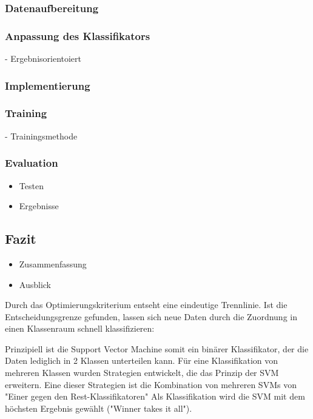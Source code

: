 \subsubsection{Datenaufbereitung}

\subsubsection{Anpassung des Klassifikators}
- Ergebnisorientoiert

\subsubsection{Implementierung}

\subsubsection{Training}
- Trainingsmethode

\subsubsection{Evaluation}
\begin{itemize}
\item{Testen}
\item{Ergebnisse}
\end{itemize}

\subsection{Fazit}
\begin{itemize}
\item{Zusammenfassung}
\item{Ausblick}
\end{itemize}

\clearpage

Durch das Optimierungskriterium entseht eine eindeutige Trennlinie.
Ist die Entscheidungsgrenze gefunden, lassen sich neue Daten durch die Zuordnung in einen Klassenraum schnell klassifizieren:

Prinzipiell ist die Support Vector Machine somit ein binärer Klassifikator,
der die Daten lediglich in 2 Klassen unterteilen kann.
Für eine Klassifikation von mehreren Klassen wurden Strategien entwickelt, die das Prinzip der SVM erweitern.
Eine dieser Strategien ist die Kombination von mehreren SVMs von  "{}Einer gegen den Rest-Klassifikatoren"{}
Als Klassifikation wird die SVM mit dem höchsten Ergebnis gewählt ("{}Winner takes it all"{}).

